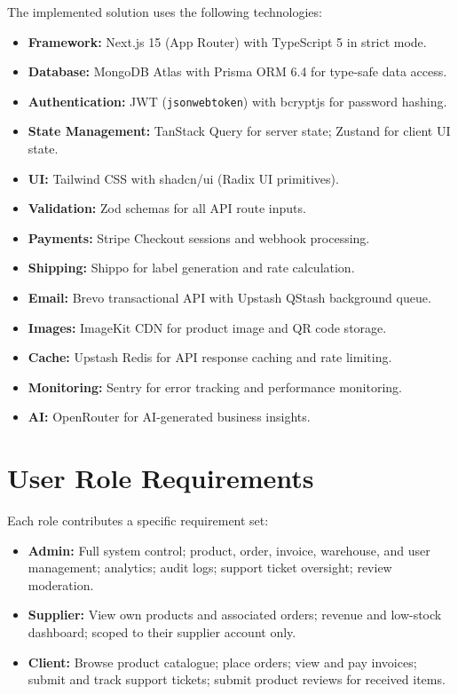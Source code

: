\documentclass[12pt,a4paper]{report}
\begin{document}
The implemented solution uses the following technologies:
\begin{itemize}
    \item \textbf{Framework:} Next.js 15 (App Router) with TypeScript 5 in strict mode.
    \item \textbf{Database:} MongoDB Atlas with Prisma ORM 6.4 for type-safe data access.
    \item \textbf{Authentication:} JWT (\texttt{jsonwebtoken}) with bcryptjs for password hashing.
    \item \textbf{State Management:} TanStack Query for server state; Zustand for client UI state.
    \item \textbf{UI:} Tailwind CSS with shadcn/ui (Radix UI primitives).
    \item \textbf{Validation:} Zod schemas for all API route inputs.
    \item \textbf{Payments:} Stripe Checkout sessions and webhook processing.
    \item \textbf{Shipping:} Shippo for label generation and rate calculation.
    \item \textbf{Email:} Brevo transactional API with Upstash QStash background queue.
    \item \textbf{Images:} ImageKit CDN for product image and QR code storage.
    \item \textbf{Cache:} Upstash Redis for API response caching and rate limiting.
    \item \textbf{Monitoring:} Sentry for error tracking and performance monitoring.
    \item \textbf{AI:} OpenRouter for AI-generated business insights.
\end{itemize}

\section{User Role Requirements}

Each role contributes a specific requirement set:
\begin{itemize}
    \item \textbf{Admin:} Full system control; product, order, invoice, warehouse, and user management; analytics; audit logs; support ticket oversight; review moderation.
    \item \textbf{Supplier:} View own products and associated orders; revenue and low-stock dashboard; scoped to their supplier account only.
    \item \textbf{Client:} Browse product catalogue; place orders; view and pay invoices; submit and track support tickets; submit product reviews for received items.
\end{itemize}
\end{document}
